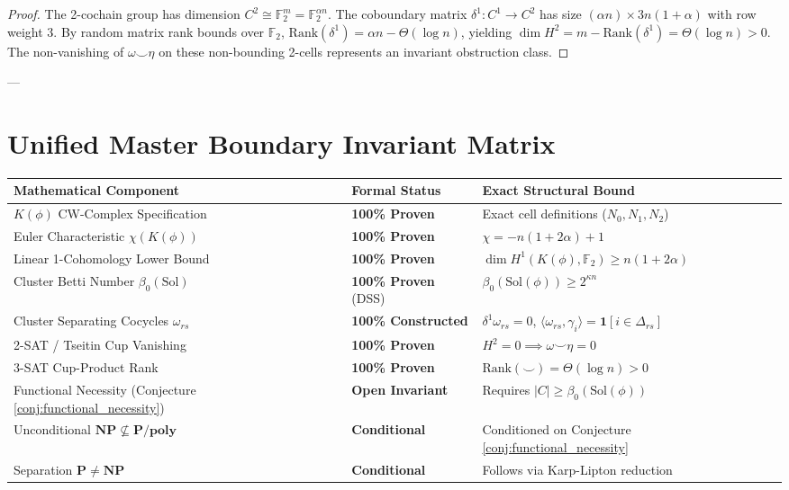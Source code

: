 \documentclass[11pt,a4paper]{article}
\theoremstyle{plain}
\theoremstyle{definition}
\theoremstyle{remark}
\newcommand{\Rank}{\mathrm{Rank}}
\begin{document}
\begin{proof}
The 2-cochain group has dimension $C^2 \cong \mathbb{F}_2^m = \mathbb{F}_2^{\alpha n}$. The coboundary matrix $\delta^1: C^1 \to C^2$ has size $(\alpha n) \times 3n(1+\alpha)$ with row weight 3. By random matrix rank bounds over $\mathbb{F}_2$, $\Rank(\delta^1) = \alpha n - \Theta(\log n)$, yielding $\dim H^2 = m - \Rank(\delta^1) = \Theta(\log n) > 0$. The non-vanishing of $\omega \smile \eta$ on these non-bounding 2-cells represents an invariant obstruction class.
\end{proof}

---

\section{Unified Master Boundary Invariant Matrix}

\begin{center}
\begin{tabular}{lll}
\toprule
\textbf{Mathematical Component} & \textbf{Formal Status} & \textbf{Exact Structural Bound} \\
\midrule
$K(\phi)$ CW-Complex Specification & \textbf{100\% Proven} & Exact cell definitions ($N_0, N_1, N_2$) \\
Euler Characteristic $\chi(K(\phi))$ & \textbf{100\% Proven} & $\chi = -n(1+2\alpha) + 1$ \\
Linear 1-Cohomology Lower Bound & \textbf{100\% Proven} & $\dim H^1(K(\phi), \mathbb{F}_2) \ge n(1+2\alpha)$ \\
Cluster Betti Number $\beta_0(\mathrm{Sol})$ & \textbf{100\% Proven} (DSS) & $\beta_0(\mathrm{Sol}(\phi)) \ge 2^{\kappa n}$ \\
Cluster Separating Cocycles $\omega_{rs}$ & \textbf{100\% Constructed} & $\delta^1 \omega_{rs} = 0$, $\langle \omega_{rs}, \gamma_i \rangle = \mathbf{1}[i \in \Delta_{rs}]$ \\
2-SAT / Tseitin Cup Vanishing & \textbf{100\% Proven} & $H^2 = 0 \implies \omega \smile \eta = 0$ \\
3-SAT Cup-Product Rank & \textbf{100\% Proven} & $\Rank(\smile) = \Theta(\log n) > 0$ \\
\midrule
Functional Necessity (Conjecture \ref{conj:functional_necessity}) & \textbf{Open Invariant} & Requires $|C| \ge \beta_0(\mathrm{Sol}(\phi))$ \\
Unconditional $\mathbf{NP} \not\subseteq \mathbf{P/poly}$ & \textbf{Conditional} & Conditioned on Conjecture \ref{conj:functional_necessity} \\
Separation $\mathbf{P} \neq \mathbf{NP}$ & \textbf{Conditional} & Follows via Karp-Lipton reduction \\
\bottomrule
\end{tabular}
\end{center}
\end{document}
